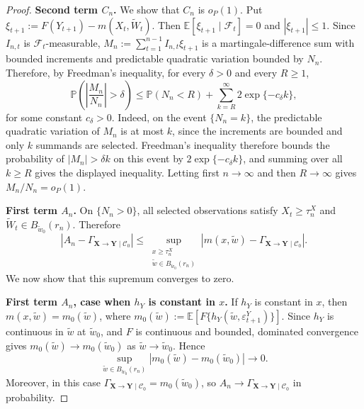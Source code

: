 \documentclass[a4paper,11pt]{article}
\begin{document}
\begin{proof}
\textbf{Second term $C_n$.} We show that $C_n$ is \(o_P(1)\).  Put
\(\xi_{t+1}:=F(Y_{t+1})-m(X_t,\tilde W_t)\). Then
\(\mathbb E[\xi_{t+1}\mid\mathcal F_t]=0\) and \(|\xi_{t+1}|\le 1\). Since
\(I_{n,t}\) is \(\mathcal F_t\)-measurable,
\(M_n:=\sum_{t=1}^{n-1}I_{n,t}\xi_{t+1}\) is a martingale-difference sum with bounded
increments and predictable quadratic variation bounded by \(N_n\). Therefore, by Freedman's inequality, for every \(\delta>0\) and every
\(R\ge1\),
\[
    \mathbb P\left(\left|\frac{M_n}{N_n}\right|>\delta\right)
    \le
    \mathbb P(N_n<R)
    +
    \sum_{k=R}^{\infty}2\exp\{-c_\delta k\},
\]
for some constant \(c_\delta>0\). Indeed, on the event \(\{N_n=k\}\), the
predictable quadratic variation of \(M_n\) is at most \(k\), since the
increments are bounded and only \(k\) summands are selected. Freedman's
inequality therefore bounds the probability of \(|M_n|>\delta k\) on this
event by \(2\exp\{-c_\delta k\}\), and summing over all \(k\ge R\) gives the
displayed inequality. Letting first \(n\to\infty\) and then \(R\to\infty\)
gives \(M_n/N_n=o_P(1)\).

\textbf{First term $A_n$.} On \(\{N_n>0\}\), all selected observations satisfy \(X_t\ge\tau_n^X\) and
\(\tilde W_t\in B_{\tilde w_0}(r_n)\). Therefore
\[
    |A_n-\Gamma_{\mathbf X\to\mathbf Y\mid\mathcal C_0}|
    \le
    \sup_{\substack{x\ge\tau_n^X\\ \tilde w\in B_{\tilde w_0}(r_n)}}
    \left|m(x,\tilde w)-\Gamma_{\mathbf X\to\mathbf Y\mid\mathcal C_0}\right|.
\]
We now show that this supremum converges to zero. 

\textbf{First term $A_n$, case when \(h_Y\) is constant in \(x\).} If \(h_Y\) is constant in \(x\), then
\(m(x,\tilde w)=m_0(\tilde w)\), where
\(m_0(\tilde w):=\mathbb E[F\{h_Y(\tilde w,\varepsilon^Y_{t+1})\}]\). Since \(h_Y\) is
continuous in \(\tilde w\) at \(\tilde w_0\), and \(F\) is continuous and bounded, dominated
convergence gives \(m_0(\tilde w)\to m_0(\tilde w_0)\) as \(\tilde w\to \tilde w_0\). Hence
\[
    \sup_{\tilde w\in B_{\tilde w_0}(r_n)}
    |m_0(\tilde w)-m_0(\tilde w_0)|
    \to0.
\]
Moreover, in this case
\(\Gamma_{\mathbf X\to\mathbf Y\mid\mathcal C_0}=m_0(\tilde w_0)\), so \(A_n\to
\Gamma_{\mathbf X\to\mathbf Y\mid\mathcal C_0}\) in probability.


\end{proof}
\end{document}
